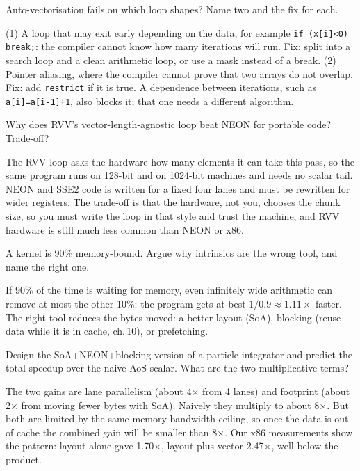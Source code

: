 \begin{exercise}[medium]
Auto-vectorisation fails on which loop shapes? Name two and the
fix for each.
\end{exercise}
\begin{solution}
(1) A loop that may exit early depending on the data, for example
\texttt{if (x[i]<0) break;}: the compiler cannot know how many iterations
will run. Fix: split into a search loop and a clean arithmetic loop, or
use a mask instead of a break. (2) Pointer aliasing, where the compiler
cannot prove that two arrays do not overlap. Fix: add \texttt{restrict}
if it is true. A dependence between iterations, such as
\texttt{a[i]=a[i-1]+1}, also blocks it; that one needs a different algorithm.
\end{solution}
\begin{exercise}[medium]
Why does RVV's vector-length-agnostic loop beat NEON for portable
code? Trade-off?
\end{exercise}
\begin{solution}
The RVV loop asks the hardware how many elements it can take this
pass, so the same program runs on 128-bit and on 1024-bit machines and
needs no scalar tail. NEON and SSE2 code is written for a fixed four lanes
and must be rewritten for wider registers. The trade-off is that the
hardware, not you, chooses the chunk size, so you must write the loop in
that style and trust the machine; and RVV hardware is still much less common
than NEON or x86.
\end{solution}
\begin{exercise}[medium]
A kernel is 90\% memory-bound. Argue why intrinsics are the wrong
tool, and name the right one.
\end{exercise}
\begin{solution}
If 90\% of the time is waiting for memory, even infinitely wide
arithmetic can remove at most the other 10\%: the program gets at best
$1/0.9\approx1.11\times$ faster. The right tool reduces the bytes moved:
a better layout (SoA), blocking (reuse data while it is in cache, ch.\,10),
or prefetching.
\end{solution}
\begin{exercise}[hard]
Design the SoA+NEON+blocking version of a particle integrator and
predict the total speedup over the naive AoS scalar. What are the
two multiplicative terms?
\end{exercise}
\begin{solution}
The two gains are lane parallelism (about 4$\times$ from 4 lanes) and
footprint (about 2$\times$ from moving fewer bytes with SoA). Naively they
multiply to about 8$\times$. But both are limited by the same memory
bandwidth ceiling, so once the data is out of cache the combined gain
will be smaller than 8$\times$. Our x86 measurements show the pattern:
layout alone gave 1.70$\times$, layout plus vector 2.47$\times$, well below
the product.
\end{solution}
